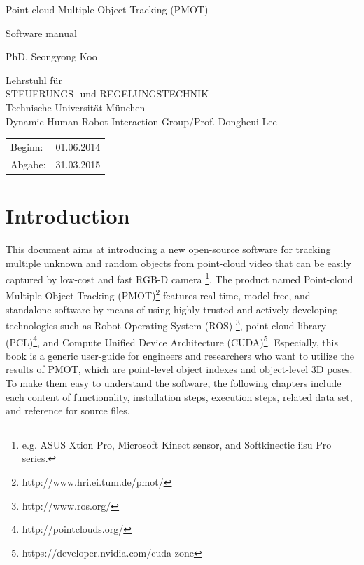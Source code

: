 \documentclass[a4paper,twoside, openright,12pt]{report}
\begin{document}
\pagestyle{fancy}
\enlargethispage{4.5cm} %
\begin{center}
\phantom{u}
\vspace{0.5cm}
\Huge{\sc Point-cloud Multiple Object Tracking (PMOT)}\\
\vspace{1.5cm}
                                 \large{Software manual

						\vspace{0.4cm}
					PhD. Seongyong Koo\\
						\vspace{0.5cm}

					\vspace{1.5cm}
					Lehrstuhl f\"ur\\
					STEUERUNGS- und REGELUNGSTECHNIK \\
					Technische Universit\"at M\"unchen\\
					\vspace{0.3cm}
					Dynamic Human-Robot-Interaction Group/Prof. Dongheui Lee}
\end{center}
\vspace{5.5cm}
\begin{tabular}{ll}
Beginn: & 01.06.2014  \\
Abgabe: &  31.03.2015 \\
\end{tabular}

\tableofcontents 


\chapter{Introduction}
This document aims at introducing a new open-source software for tracking multiple unknown and random objects from point-cloud video that can be easily captured by low-cost and fast RGB-D camera \footnote[1]{e.g. ASUS Xtion Pro, Microsoft Kinect sensor, and Softkinectic iisu Pro series.}. The product named Point-cloud Multiple Object Tracking (PMOT)\footnote[2]{http://www.hri.ei.tum.de/pmot/} features real-time, model-free, and standalone software by means of using highly trusted and actively developing technologies such as  Robot Operating System (ROS) \footnote[3]{http://www.ros.org/}, point cloud library (PCL)\footnote[4]{http://pointclouds.org/}, and Compute Unified Device Architecture (CUDA)\footnote[5]{https://developer.nvidia.com/cuda-zone}. Especially, this book is a generic user-guide for engineers and researchers who want to utilize the results of PMOT, which are point-level object indexes and object-level 3D poses. To make them easy to understand the software, the following chapters include each content of functionality, installation steps, execution steps, related data set, and reference for source files. 
\end{document}
